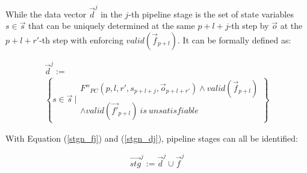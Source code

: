 \documentclass[conference]{IEEEtran}
\begin{document}
% 

While the data vector $\vec{d}^j$ in the $j$-th pipeline stage 
is the set of state variables $s\in \vec{s}$ 
that can be uniquely determined at the same $p+l+j$-th step 
by $\vec{o}$ at the $p+l+r'$-th step with enforcing $valid(\vec{f}_{p+l})$.
It can be formally defined as:

\begin{multline}\label{stgn_dj}
\vec{d}^{j} := \\
 \left\{
 s\in \vec{s} ~| 
 \begin{array}{cc}
 F''_{PC}(p,l,r',s_{p+l+j},\vec{o}_{p+l+r'})\wedge valid(\vec{f}_{p+l})\\
 \wedge valid(\vec{f'}_{p+l})~is~unsatisfiable
 \end{array}
\right\}
\end{multline}

With Equation (\ref{stgn_fj}) and (\ref{stgn_dj}),
pipeline stages can all be identified:

\begin{equation}
 \vec{stg}^j := \vec{d}^j\cup\vec{f}^j
\end{equation}


% 
% 
% 
\end{document}
